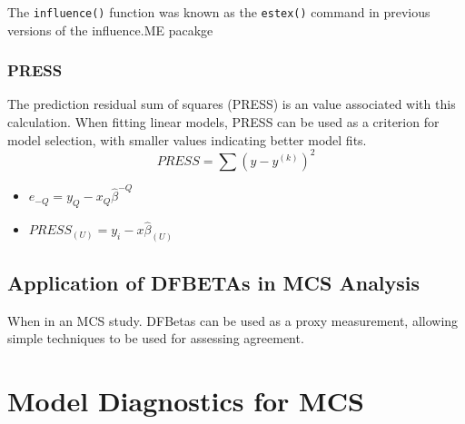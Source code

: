 	
	The \texttt{influence()} function was known as the \texttt{estex()} command in previous versions of the influence.ME pacakge

	
	
	
	
	


	\subsection{PRESS} %
	The prediction residual sum of squares (PRESS) is an value associated with this calculation. When fitting linear models, PRESS can be used as a criterion for model selection, with smaller values indicating better model fits.
	\begin{equation}
	PRESS = \sum(y-y^{(k)})^2
	\end{equation}
	
	
	\begin{itemize}
		\item $e_{-Q} = y_{Q} - x_{Q}\hat{\beta}^{-Q}$
		\item $PRESS_{(U)} = y_{i} - x\hat{\beta}_{(U)}$
	\end{itemize}
	



\section{Application of DFBETAs in MCS Analysis}


When in an MCS study. DFBetas can be used as a proxy measurement, allowing simple techniques to be used for assessing agreement.



\chapter{Model Diagnostics for MCS}

